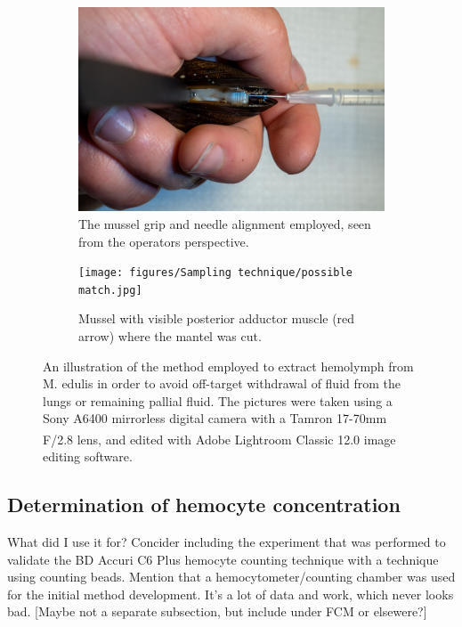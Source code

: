 \begin{figure}
\begin{subfigure}[b]{.45\textwidth}
        \centering
        \includegraphics[width=\textwidth]{figures/Sampling technique/hands colors centered.jpg}
        \caption{The mussel grip and needle alignment employed, seen from the operators perspective. }
        \label{sfig:c}
    \end{subfigure}
    \hfill
    \begin{subfigure}[b]{.45\textwidth}
        \centering
        \texttt{[image: figures/Sampling technique/possible match.jpg]}
        \caption{Mussel with visible posterior adductor muscle (red arrow) where the mantel was cut.}
        \label{sfig:d}
    \end{subfigure}
    \caption{An illustration of the method employed to extract hemolymph from M. edulis in order to avoid off-target withdrawal of fluid from the lungs or remaining pallial fluid. The pictures were taken using a Sony A6400 mirrorless digital camera with a Tamron 17-70mm F/2.8 lens, and edited with Adobe\textsuperscript{\textregistered} Lightroom Classic 12.0 image editing software.}
    \label{fig:Hemolymph_sampling_illustration}
\end{figure}



\subsection{Determination of hemocyte concentration}
What did I use it for?
Concider including the experiment that was performed to validate the BD Accuri C6 Plus hemocyte counting technique with a technique using counting beads. Mention that a hemocytometer/counting chamber was used for the initial method development. It's a lot of data and work, which never looks bad. [Maybe not a separate subsection, but include under FCM or elsewere?]


